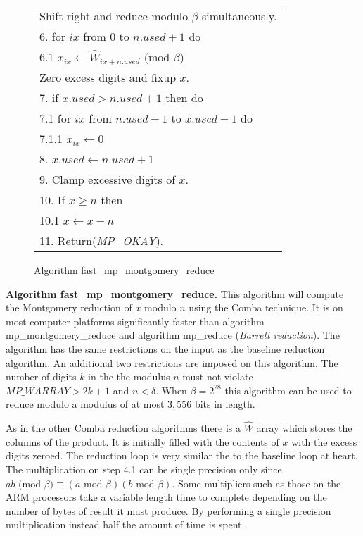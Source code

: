 \documentclass[b5paper]{book}
\begin{document}
\begin{figure}[!here]
\begin{small}
\begin{center}
\begin{tabular}{l}
Shift right and reduce modulo $\beta$ simultaneously. \\
6.  for $ix$ from $0$ to $n.used + 1$ do \\
\hspace{3mm}6.1  $x_{ix} \leftarrow \hat W_{ix + n.used} \mbox{ (mod }\beta\mbox{)}$ \\
Zero excess digits and fixup $x$. \\
7.  if $x.used > n.used + 1$ then do \\
\hspace{3mm}7.1  for $ix$ from $n.used + 1$ to $x.used - 1$ do \\
\hspace{6mm}7.1.1  $x_{ix} \leftarrow 0$ \\
8.  $x.used \leftarrow n.used + 1$ \\
9.  Clamp excessive digits of $x$. \\
10.  If $x \ge n$ then \\
\hspace{3mm}10.1  $x \leftarrow x - n$ \\
11.  Return(\textit{MP\_OKAY}). \\
\hline
\end{tabular}
\end{center}
\end{small}
\caption{Algorithm fast\_mp\_montgomery\_reduce}
\end{figure}

\textbf{Algorithm fast\_mp\_montgomery\_reduce.}
This algorithm will compute the Montgomery reduction of $x$ modulo $n$ using the Comba technique.  It is on most computer platforms significantly
faster than algorithm mp\_montgomery\_reduce and algorithm mp\_reduce (\textit{Barrett reduction}).  The algorithm has the same restrictions
on the input as the baseline reduction algorithm.  An additional two restrictions are imposed on this algorithm.  The number of digits $k$ in the 
the modulus $n$ must not violate $MP\_WARRAY > 2k +1$ and $n < \delta$.   When $\beta = 2^{28}$ this algorithm can be used to reduce modulo
a modulus of at most $3,556$ bits in length.  

As in the other Comba reduction algorithms there is a $\hat W$ array which stores the columns of the product.  It is initially filled with the
contents of $x$ with the excess digits zeroed.  The reduction loop is very similar the to the baseline loop at heart.  The multiplication on step
4.1 can be single precision only since $ab \mbox{ (mod }\beta\mbox{)} \equiv (a \mbox{ mod }\beta)(b \mbox{ mod }\beta)$.  Some multipliers such
as those on the ARM processors take a variable length time to complete depending on the number of bytes of result it must produce.  By performing
a single precision multiplication instead half the amount of time is spent.
\end{document}
